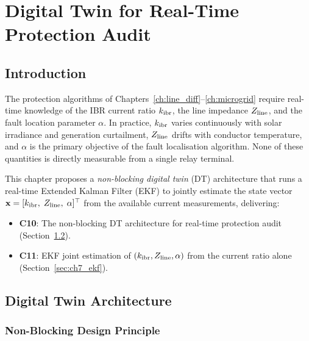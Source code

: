 \chapter{Digital Twin for Real-Time Protection Audit}
\label{ch:digital_twin}

\section{Introduction}
\label{sec:ch7_intro}

The protection algorithms of Chapters~\ref{ch:line_diff}--\ref{ch:microgrid}
require real-time knowledge of the IBR current ratio $k_\mathrm{ibr}$, the line
impedance $Z_\mathrm{line}$, and the fault location parameter $\alpha$.
In practice, $k_\mathrm{ibr}$ varies continuously with solar irradiance and
generation curtailment, $Z_\mathrm{line}$ drifts with conductor temperature,
and $\alpha$ is the primary objective of the fault localisation algorithm.
None of these quantities is directly measurable from a single relay terminal.

This chapter proposes a \emph{non-blocking digital twin} (DT) architecture
that runs a real-time Extended Kalman Filter (EKF) to jointly estimate
the state vector $\mathbf{x} = [k_\mathrm{ibr},\; Z_\mathrm{line},\; \alpha]^\top$ from
the available current measurements, delivering:
\begin{itemize}
\item \textbf{C10}: The non-blocking DT architecture for real-time
      protection audit (Section~\ref{sec:ch7_architecture}).
\item \textbf{C11}: EKF joint estimation of $(k_\mathrm{ibr}, Z_\mathrm{line}, \alpha)$
      from the current ratio alone (Section~\ref{sec:ch7_ekf}).
\end{itemize}

\section{Digital Twin Architecture}
\label{sec:ch7_architecture}

\subsection{Non-Blocking Design Principle}

